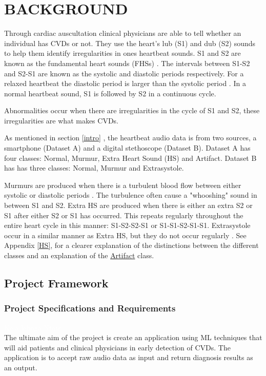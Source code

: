 \documentclass[10pt,twocolumn]{witseiepaper}
\begin{document}

\section{BACKGROUND}
\label{back}
Through cardiac auscultation clinical physicians are able to tell whether an individual has CVDs or not. They use the heart's lub (S1) and dub (S2) sounds to help them identify irregularities in ones heartbeat sounds. S1 and S2 are known as the fundamental heart sounds (FHSs) \cite{54}. The intervals between S1-S2 and S2-S1 are known as the systolic and diastolic periods respectively. For a relaxed heartbeat the diastolic period is larger than the systolic period \cite{orient2010sapira}. In a normal heartbeat sound, S1 is followed by S2 in a continuous cycle.

Abnormalities occur when there are irregularities in the cycle of S1 and S2, these irregularities are what makes CVDs. 

As mentioned in section \ref{intro} , the heartbeat audio data is from two sources, a smartphone (Dataset A) and a digital stethoscope (Dataset B). Dataset A has four classes: Normal, Murmur, Extra Heart Sound (HS) and Artifact. Dataset B has has three classes: Normal, Murmur and Extrasystole. 

Murmurs are produced when there is a turbulent blood flow between either systolic or diastolic periods \cite{35}. The turbulence often cause a "whooshing" sound in between S1 and S2. Extra HS are produced when there is either an extra S2 or S1 after either S2 or S1 has occurred. This repeats regularly throughout the entire heart cycle in this manner: S1-S2-S2-S1 or S1-S1-S2-S1-S1. Extrasystole occur in a similar manner as Extra HS, but they do not occur regularly \cite{bentley}. See Appendix \ref{HS}, for a clearer explanation of the distinctions between the different classes and an explanation of the \hyperref[sec:arti]{Artifact} class.

\subsection{Project Framework}
\subsubsection{Project Specifications and Requirements}
\label{sec:req}
\textcolor{white}{Ke a leboga Ntate}\\
The ultimate aim of the project is create an application using ML techniques that will aid patients and clinical physicians in early detection of CVDs. The application is to accept raw audio data as input and return diagnosis results as an output.
\end{document}
